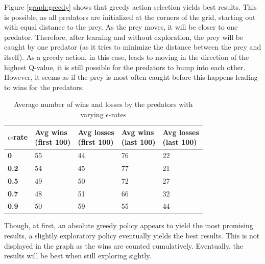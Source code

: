 Figure \ref{graph:greedy} shows that greedy action selection yields best results. This is possible, as all predators are initialized at the corners of the grid, starting out with equal distance to the prey. As the prey moves, it will be closer to one predator. Therefore, after learning and without exploration, the prey will be caught by one predator (as it tries to minimize the distance between the prey and itself). As a greedy action, in this case, leads to moving in the direction of the highest Q-value, it is still possible for the predators to bump into each other. However, it seems as if the prey is most often caught before this happens leading to wins for the predators.

\begin{table}[H]
\begin{center}
\begin{tabular}{| l | l | l | l | l |}
\hline
\parbox{2cm}{\textbf{$\epsilon$-rate}} & \parbox{2cm}{\textbf{Avg wins \\ (first 100)}} & \parbox{2cm}{\textbf{Avg losses \\ (first 100)}} & \parbox{2cm}{\textbf{Avg wins \\ (last 100)}} & \parbox{2cm}{\textbf{Avg losses \\ (last 100)}} \\
\hline
\textbf{0} & 55 & 44 & 76 & 22 \\
\hline
\textbf{0.2} & 54 & 45 & 77 & 21 \\
\hline
\textbf{0.5} & 49 & 50 & 72 & 27 \\
\hline
\textbf{0.7} & 48 & 51 & 66 & 32 \\
\hline
\textbf{0.9} & 50 & 59 & 55 & 44 \\
\hline
\end{tabular}
\caption{Average number of wins and losses by the predators with varying $\epsilon$-rates}
\label{table:greedy}
\end{center}
\end{table}


Though, at first, an absolute greedy policy appears to yield the most promising results, a slightly exploratory policy eventually yields the best results. This is not displayed in the graph as the wins are counted cumulatively. Eventually, the results will be best when still exploring sightly.
